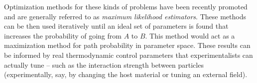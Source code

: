 \documentclass[11pt]{article}
\begin{document}
Optimization methods for these kinds of problems have been recently promoted and are generally referred to as {\it maximum likelihood estimators}. %
These methods can be then used iteratively until an ideal set of parameters is found that increases the probability of going from $A$ to $B$.  This method would act as a maximization method for path probability in parameter space.  These results can be informed by real thermodynamic control parameters that experimentalists can actually tune -- such as the interaction strength between particles (experimentally, say, by changing the host material or tuning an external field).
\end{document}
